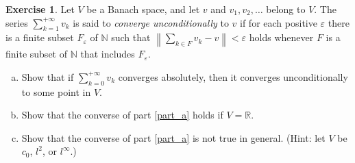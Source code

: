 \documentclass[11pt,a4paper,twoside]{article}
\theoremstyle{definition}
\newcounter{excounter}
\newtheorem{exercise}[excounter]{Exercise}
\begin{document}
\begin{exercise}

  Let $V$ be a Banach space, and let $v$ and $v_1, v_2, \dotsc$ belong to $V$.
  The series $\sum_{k = 1}^{+\infty} v_k$ is said to \emph{converge unconditionally} to $v$ if for each positive $\varepsilon$
  there is a finite subset $F_\varepsilon$ of $\mathbb{N}$ such that $\left\| \sum_{k \in F} v_k - v \right\| < \varepsilon$ holds whenever
  $F$ is a finite subset of $\mathbb{N}$ that includes $F_\varepsilon$.

  \begin{enumerate}[(a)]
  \item \label {part_a} Show that if $\sum_{k = 0}^{+\infty} v_k$ converges absolutely, then it converges unconditionally to some point in $V$.
  \item Show that the converse of part \ref{part_a} holds if $V = \mathbb{R}$.
  \item Show that the converse of part \ref{part_a} is not true in general. (Hint: let $V$ be $c_0$, $l^2$, or $l^\infty$.)
  \end{enumerate}

\end{exercise}
\end{document}
